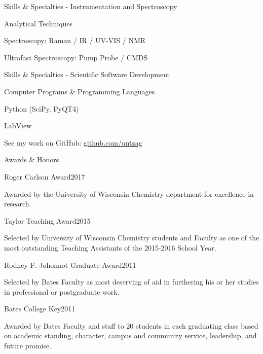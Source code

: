 \documentclass{resume}  %
\begin{document}
\begin{rSection}{Skills \& Specialties - Instrumentation and Spectroscopy}
	
\begin{rSubsection}{Analytical Techniques}{}{}{}
\item Spectroscopy: Raman / IR / UV-VIS / NMR
\item Ultrafast Spectroscopy: Pump Probe / CMDS 
\end{rSubsection}

\end{rSection}

\begin{rSection}{Skills \& Specialties - Scientific Software Development}

\begin{rSubsection}{Computer Programs \& Programming Languages}{}{}{}
\item Python (SciPy, PyQT4)
\item LabView
\item See my work on GitHub: \href{https://github.com/untzag}{github.com/untzag}
\end{rSubsection}

\end{rSection}


\begin{rSection}{Awards \& Honors}

\begin{rSubsection}{Roger Carlson Award}{2017}{}{}
	\item Awarded by the University of Wisconsin Chemistry department for excellence in research.
\end{rSubsection}

\begin{rSubsection}{Taylor Teaching Award}{2015}{}{}
\item  Selected by University of Wisconsin Chemistry students and Faculty as one of the most outstanding Teaching Assistants of the 2015-2016 School Year.
\end{rSubsection}

\begin{rSubsection}{Rodney F. Johonnot Graduate Award}{2011}{}{}
\item  Selected by Bates Faculty as most deserving of aid in furthering his or her studies in professional or postgraduate work.
\end{rSubsection}

\begin{rSubsection}{Bates College Key}{2011}{}{}
\item Awarded by Bates Faculty and staff to 20 students in each graduating class based on academic standing, character, campus and community service, leadership, and future promise.
\end{rSubsection}

\end{rSection}
\end{document}
